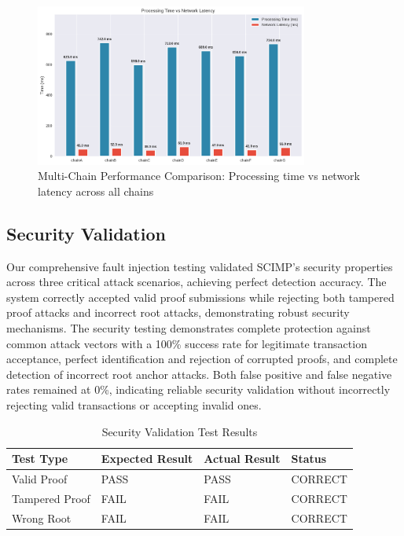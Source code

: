 \begin{figure}[h]
\centering
\includegraphics[width=0.8\textwidth]{Images/multichain_comparison.png}
\caption{Multi-Chain Performance Comparison: Processing time vs network latency across all chains}
\label{fig:multichain-comparison}
\end{figure}

\subsection{Security Validation}

Our comprehensive fault injection testing validated SCIMP's security properties across three critical attack scenarios, achieving perfect detection accuracy. The system correctly accepted valid proof submissions while rejecting both tampered proof attacks and incorrect root attacks, demonstrating robust security mechanisms. The security testing demonstrates complete protection against common attack vectors with a 100\% success rate for legitimate transaction acceptance, perfect identification and rejection of corrupted proofs, and complete detection of incorrect root anchor attacks. Both false positive and false negative rates remained at 0\%, indicating reliable security validation without incorrectly rejecting valid transactions or accepting invalid ones.

\begin{table}[h]
\centering
\begin{tabular}{|l|l|l|l|}
\hline
\textbf{Test Type} & \textbf{Expected Result} & \textbf{Actual Result} & \textbf{Status} \\
\hline
Valid Proof & PASS & PASS & CORRECT \\
\hline
Tampered Proof & FAIL & FAIL & CORRECT \\
\hline
Wrong Root & FAIL & FAIL & CORRECT \\
\hline
\end{tabular}
\caption{Security Validation Test Results}
\label{tab:security-results}
\end{table}


